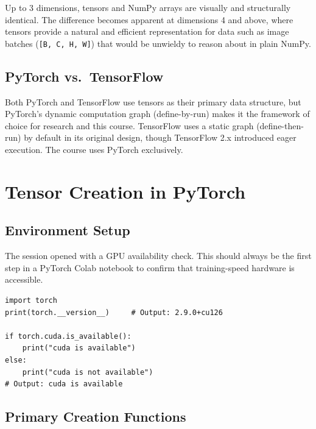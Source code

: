 \documentclass[12pt,a4paper]{article}
\newcommand{\ttt}[1]{\texttt{#1}}
\begin{document}
\begin{keyinsight}[title=Tensors vs.\ NumPy Arrays]
Up to 3 dimensions, tensors and NumPy arrays are visually and structurally
identical. The difference becomes apparent at dimensions 4 and above, where
tensors provide a natural and efficient representation for data such as
image batches (\ttt{[B, C, H, W]}) that would be unwieldy to reason about
in plain NumPy.
\end{keyinsight}

\subsection{PyTorch vs.\ TensorFlow}

Both PyTorch and TensorFlow use tensors as their primary data structure, but
PyTorch's dynamic computation graph (define-by-run) makes it the framework
of choice for research and this course. TensorFlow uses a static graph
(define-then-run) by default in its original design, though TensorFlow 2.x
introduced eager execution. The course uses PyTorch exclusively.

\section{Tensor Creation in PyTorch}
\label{sec:creation}

\subsection{Environment Setup}

The session opened with a GPU availability check. This should always be the
first step in a PyTorch Colab notebook to confirm that training-speed hardware
is accessible.

\begin{lstlisting}[caption={Environment setup and GPU check (V03, 00:16:00).},
                   label={lst:setup}]
import torch
print(torch.__version__)     # Output: 2.9.0+cu126

if torch.cuda.is_available():
    print("cuda is available")
else:
    print("cuda is not available")
# Output: cuda is available
\end{lstlisting}

\subsection{Primary Creation Functions}
\end{document}
